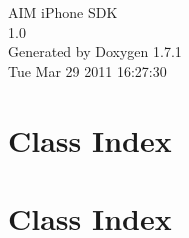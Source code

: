 \documentclass[a4paper]{book}
\begin{document}
\hypersetup{pageanchor=false}
\begin{titlepage}
\vspace*{7cm}
\begin{center}
{\Large AIM iPhone SDK \\[1ex]\large 1.0 }\\
\vspace*{1cm}
{\large Generated by Doxygen 1.7.1}\\
\vspace*{0.5cm}
{\small Tue Mar 29 2011 16:27:30}\\
\end{center}
\end{titlepage}
\clearemptydoublepage
{}
\tableofcontents
\clearemptydoublepage
{}
\hypersetup{pageanchor=true}
\chapter{Class Index}

\chapter{Class Index}

\end{document}
